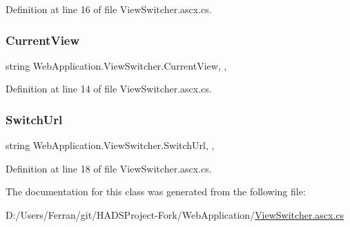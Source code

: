 Definition at line 16 of file View\+Switcher.\+ascx.\+cs.

\mbox{\label{classWebApplication_1_1ViewSwitcher_a65a2e1bbc4abb8488ed59abc6904f47a}} 
\subsubsection{\texorpdfstring{CurrentView}{CurrentView}}
{\footnotesize\ttfamily string Web\+Application.\+View\+Switcher.\+Current\+View\hspace{0.3cm}{\ttfamily [get]}, {}, {\ttfamily [protected]}}



Definition at line 14 of file View\+Switcher.\+ascx.\+cs.

\mbox{\label{classWebApplication_1_1ViewSwitcher_aa6e83ed2a4b0c20c680600d42d3aed05}} 
\subsubsection{\texorpdfstring{SwitchUrl}{SwitchUrl}}
{\footnotesize\ttfamily string Web\+Application.\+View\+Switcher.\+Switch\+Url\hspace{0.3cm}{\ttfamily [get]}, {}, {\ttfamily [protected]}}



Definition at line 18 of file View\+Switcher.\+ascx.\+cs.



The documentation for this class was generated from the following file\+:\begin{DoxyCompactItemize}
\item 
D\+:/\+Users/\+Ferran/git/\+H\+A\+D\+S\+Project-\/\+Fork/\+Web\+Application/\mbox{\hyperlink{ViewSwitcher_8ascx_8cs}{View\+Switcher.\+ascx.\+cs}}\end{DoxyCompactItemize}
